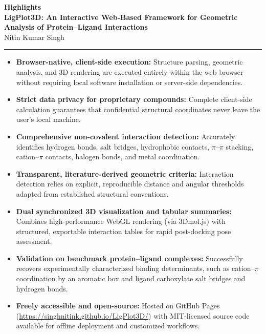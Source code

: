 \documentclass[11pt,a4paper]{article}
\begin{document}
\begin{center}
    {\LARGE \textbf{\color{primary} Highlights}}\\[1.2em]
    {\large \textbf{LigPlot3D: An Interactive Web-Based Framework for Geometric Analysis of Protein--Ligand Interactions}}\\[0.8em]
    {\small Nitin Kumar Singh}\\[0.3em]
    \rule{\linewidth}{0.8pt}
\end{center}

\vspace{0.8em}

\begin{itemize}[leftmargin=1.5em, itemsep=1.2em]
    \item \textbf{Browser-native, client-side execution:} Structure parsing, geometric analysis, and 3D rendering are executed entirely within the web browser without requiring local software installation or server-side dependencies.

    \item \textbf{Strict data privacy for proprietary compounds:} Complete client-side calculation guarantees that confidential structural coordinates never leave the user's local machine.

    \item \textbf{Comprehensive non-covalent interaction detection:} Accurately identifies hydrogen bonds, salt bridges, hydrophobic contacts, $\pi$--$\pi$ stacking, cation--$\pi$ contacts, halogen bonds, and metal coordination.

    \item \textbf{Transparent, literature-derived geometric criteria:} Interaction detection relies on explicit, reproducible distance and angular thresholds adapted from established structural conventions.

    \item \textbf{Dual synchronized 3D visualization and tabular summaries:} Combines high-performance WebGL rendering (via 3Dmol.js) with structured, exportable interaction tables for rapid post-docking pose assessment.

    \item \textbf{Validation on benchmark protein--ligand complexes:} Successfully recovers experimentally characterized binding determinants, such as cation--$\pi$ coordination by an aromatic box and ligand carboxylate salt bridges and hydrogen bonds.

    \item \textbf{Freely accessible and open-source:} Hosted on GitHub Pages (\url{https://singhnitink.github.io/LigPlot3D/}) with MIT-licensed source code available for offline deployment and customized workflows.
\end{itemize}
\end{document}
